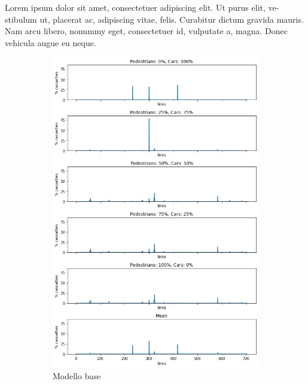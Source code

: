 Lorem ipsum dolor sit amet, consectetuer adipiscing elit. Ut purus elit, ve-
stibulum ut, placerat ac, adipiscing vitae, felis. Curabitur dictum gravida mauris.
Nam arcu libero, nonummy eget, consectetuer id, vulputate a, magna. Donec
vehicula augue eu neque.


\begin{figure}
    \centering
    \begin{subfigure}{0.475\textwidth}
        \centering
        \includegraphics[width=\textwidth]{images/analisi/base_links_casualties}
        \caption{Modello base}
        \label{fig:base-link-casualties}
    \end{subfigure}
    \hfill
    \begin{subfigure}{0.475\textwidth}
        \centering

\end{subfigure}
\end{figure}
